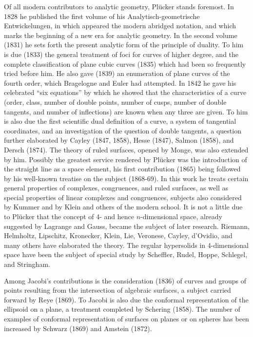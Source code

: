 \documentclass[oneside]{book}
\begin{document}
Of all modern contributors to analytic geometry, Pl\"ucker stands
foremost. In 1828 he published the first volume of his
Analytisch-geometrische Entwickelungen, in which appeared
the modern abridged notation, and which marks the beginning of a new
era for analytic geometry. In the second volume (1831) he sets forth
the present analytic form of the principle of duality. To him is due
(1833) the general treatment of foci for curves of higher degree,
and the complete classification of plane cubic curves (1835) which
had been so frequently tried before him. He also gave (1839) an
enumeration of plane curves of the fourth order, which Bragelogne
and Euler had attempted. In 1842 he gave his celebrated ``six
equations'' by which he showed that the characteristics of a curve
(order, class, number of double points, number of cusps, number of
double tangents, and number of inflections) are known when any three
are given. To him is also due the first scientific dual definition
of a curve, a system of tangential coordinates, and an
investigation of the question of double tangents, a question further
elaborated by Cayley (1847, 1858), Hesse (1847), Salmon (1858), and
Dersch (1874). The theory of ruled surfaces, opened by Monge, was
also extended by him. Possibly the greatest service rendered by
Pl\"ucker was the introduction of the straight line as a space
element, his first contribution (1865) being followed by his
well-known treatise on the subject (1868-69). In this work he treats
certain general properties of complexes, congruences, and ruled
surfaces, as well as special properties of linear complexes and
congruences, subjects also considered by Kummer and by Klein and
others of the modern school. It is not a little due to Pl\"ucker that
the concept of 4- and hence $n$-dimensional space, already suggested
by Lagrange and Gauss, became the subject of later
research. Riemann, Helmholtz, Lipschitz, Kronecker, Klein, Lie,
Veronese, Cayley, d'Ovidio, and many others have elaborated the
theory. The regular hypersolids in 4-dimensional space have been
the subject of special study by Scheffler, Rudel, Hoppe, Schlegel,
and Stringham.

Among Jacobi's contributions is the consideration (1836) of curves
and groups of points resulting from the intersection of algebraic
surfaces, a subject carried forward by Reye (1869). To Jacobi is
also due the conformal representation of the ellipsoid on a plane, a
treatment completed by Schering (1858). The number of examples of
conformal representation of surfaces on planes or on spheres has
been increased by Schwarz (1869) and Amstein (1872).
\end{document}
